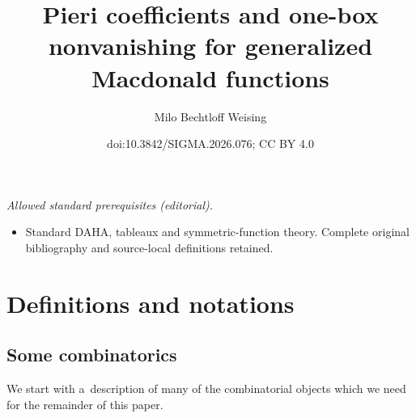 \documentclass[10pt,a4paper]{amsart}
\title{Pieri coefficients and one-box nonvanishing for generalized Macdonald functions}
\author{Milo Bechtloff Weising}
\date{doi:10.3842/SIGMA.2026.076; CC BY 4.0}
\numberwithin{equation}{section}
\theoremstyle{definition}
\begin{document}
\maketitle
\noindent\textit{Allowed standard prerequisites (editorial).}\begin{itemize}
\item Standard DAHA, tableaux and symmetric-function theory. Complete original bibliography and source-local definitions retained.
\end{itemize}\medskip
\section{Definitions and notations}\label{defs and nots}

\subsection{Some combinatorics}

We start with a~description of many of the combinatorial objects which we need for the remainder of this paper.
\end{document}

